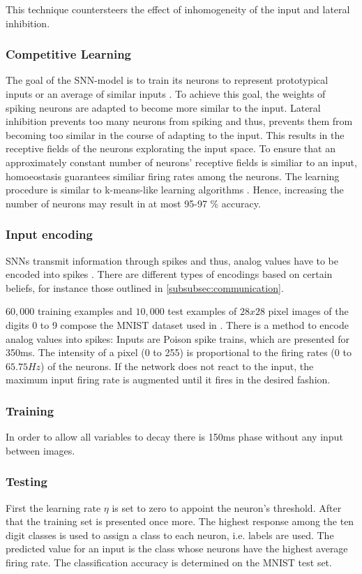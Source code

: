 This technique countersteers the effect of inhomogeneity of the input and lateral inhibition.


\subsubsection{Competitive Learning}
The goal of the \ac{SNN}-model is to train its neurons to represent prototypical inputs or an average of similar inputs \cite{SNN}.
To achieve this goal, the weights of spiking neurons are adapted to become more similar to the input.
Lateral inhibition prevents too many neurons from spiking and thus, prevents them from becoming too similar in the course of adapting to the input.
This results in the receptive fields of the neurons explorating the input space.
To ensure that an approximately constant number of neurons' receptive fields is similiar to an input, 
homoeostasis guarantees similiar firing rates among the neurons.
The learning procedure is similar to k-means-like learning algorithms \cite{SNN}.
Hence, increasing the number of neurons may result in at most 95-97 \% accuracy.


\subsubsection{Input encoding}
\acp{SNN} transmit information through spikes and thus, analog values have to be encoded into spikes \cite{DIET_SNN}.
There are different types of encodings based on certain beliefs, 
for instance those outlined in \autoref{subsubsec:communication}.

$60,000$ training examples and $10,000$ test examples of $28x28$ pixel images of the digits 0 to 9 compose the MNIST dataset used in \cite{SNN}.
There is a method to encode analog values into spikes:
Inputs are Poison spike trains, which are presented for 350ms.
The intensity of a pixel (0 to 255) is proportional to the firing rates (0 to $65.75 Hz$) of the neurons.
If the network does not react to the input, the maximum input firing rate is augmented until it fires in the desired fashion. 


\subsubsection{Training}
In order to allow all variables to decay there is 150ms phase without any input between images.

\subsubsection{Testing}
First the learning rate $\eta$ is set to zero to appoint the neuron's threshold.
After that the training set is presented once more.
The highest response among the ten digit classes is used to assign a class to each neuron, i.e. labels are used.
The predicted value for an input is the class whose neurons have the highest average firing rate.
The classification accuracy is determined on the MNIST test set.